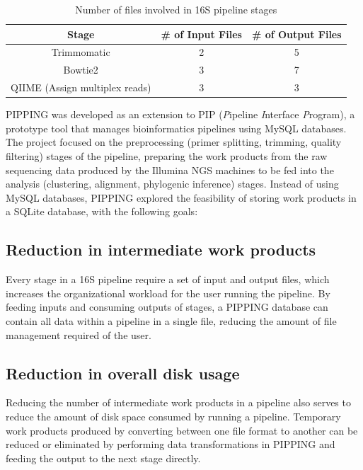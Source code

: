 \documentclass[12pt]{article}
\begin{document}
	\begin{table}[h!]
		\centering
		\begin{tabular}{ccc}
		\toprule
		Stage & {\# of Input Files} & {\# of Output Files}\\
		\midrule
		Trimmomatic & 2 & 5 \\
		Bowtie2 & 3 & 7\\
		QIIME (Assign multiplex reads) & 3 & 3\\
		\bottomrule
		\end{tabular}
		\caption{Number of files involved in 16S pipeline stages}
		\label{tab:stages_files}
	\end{table}
	
	PIPPING was developed as an extension to PIP\cite{Conery:2005:RWM:1089844.1089845} (\emph{P}ipeline \emph{I}nterface \emph{P}rogram), a prototype 
	tool that manages bioinformatics pipelines using MySQL databases. 
	The project focused on the preprocessing (primer splitting, trimming, quality filtering) 
	stages of the pipeline, preparing the work products from the raw sequencing 
	data produced by the Illumina NGS machines to be fed into the analysis (clustering, alignment, phylogenic inference) 
	stages. Instead of using MySQL databases, PIPPING explored the feasibility of 
	storing work products in a SQLite database, with the following goals:
	
	\subsection{Reduction in intermediate work products} %
	\label{sub:reduction_in_intermediate_work_products}
	Every stage in a 16S pipeline require a set of input and output files, which increases 
	the organizational workload for the user running the pipeline. By feeding inputs and
	consuming outputs of stages, a PIPPING database can contain all data within a pipeline
	in a single file, reducing the amount of file management required of the user. 


	\subsection{Reduction in overall disk usage} %
	\label{sub:reduction_in_overall_disk_usage}
	Reducing the number of intermediate work products in a pipeline also serves to reduce 
	the amount of disk space consumed by running a pipeline. Temporary work products 
	produced by converting between one file format to another can be reduced or eliminated 
	by performing data transformations in PIPPING and feeding the output to the next stage 
	directly. 
\end{document}
